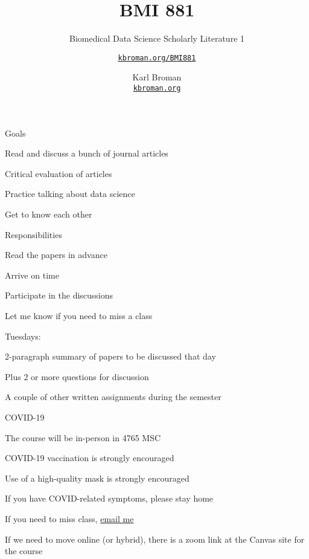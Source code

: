 \documentclass[aspectratio=169,12pt,t]{beamer}
\title{BMI 881}
\subtitle{Biomedical Data Science Scholarly Literature 1}
\author{\href{https://kbroman.org/BMI881}{\tt kbroman.org/BMI881} }
\institute{}
\date{\small \hspace{3in} Karl Broman \\
  \hspace{3in} \href{https://kbroman.org}{\color{foreground}
    \small \tt kbroman.org}}
\begin{document}
{
\frame{
  \titlepage
} }




\begin{frame}{Goals}

  \bbi
\item Read and discuss a bunch of journal articles
\item Critical evaluation of articles
\item Practice talking about data science
\item Get to know each other
  \ei

\end{frame}














\begin{frame}{Responsibilities}

  \bbi
\item Read the papers in advance
\item Arrive on time
\item Participate in the discussions
\item Let me know if you need to miss a class
\item Tuesdays:
  \bi
  \item 2-paragraph summary of papers to be discussed that day
  \item Plus 2 or more questions for discussion
  \ei
\item A couple of other written assignments during the semester
  \ei

\end{frame}



\begin{frame}{COVID-19}

  \bbi
\item The course will be in-person in 4765 MSC
\item COVID-19 vaccination is strongly encouraged
\item Use of a high-quality mask is strongly encouraged
\item If you have COVID-related symptoms, please stay home
\item If you need to miss class, \href{mailto:broman@wisc.edu}{email me}
\item If we need to move online (or hybrid), there is a zoom link at
  the Canvas site for the course
  \ei

\end{frame}
\end{document}

